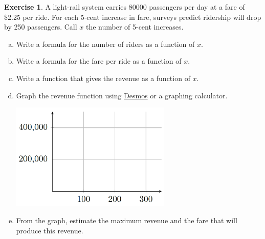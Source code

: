 \documentclass[11pt,reqno,final]{amsart}
\numberwithin{equation}{section}
\numberwithin{figure}{section}
\theoremstyle{definition} %
\newtheorem{exercise}[question]{Exercise}
\begin{document}
\begin{exercise}
        A light-rail system carries 80000 passengers per day at a fare of \$2.25 per ride.
        For each 5-cent increase in fare, surveys predict ridership will drop by 250 passengers.
        Call $x$ the number of 5-cent increases.
        \begin{enumerate}[(a)]
        \item Write a formula for the number of riders as a function of $x$.
                \vfill
        \item Write a formula for the fare per ride as a function of $x$.
                \vfill
        \item Write a function that gives the revenue as a function of $x$.
                \vfill
        \item Graph the revenue function using \href{https://www.desmos.com/}{Desmos} or a graphing calculator.
                \begin{center}
                        \includegraphics[width=3in]{09-07P_graph1.png}
                \end{center}
        \item From the graph, estimate the maximum revenue and the fare that will produce this revenue.
                \vfill
        \end{enumerate}
\end{exercise}

\newpage
\end{document}
